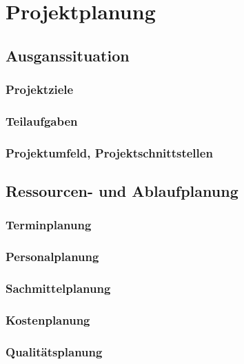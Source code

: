 \chapter{Projektplanung}
\label{cha:Projektmanagement}

\section{Ausganssituation}
	\subsection{Projektziele}
	
	\subsection{Teilaufgaben}
	
	\subsection{Projektumfeld, Projektschnittstellen}
	
\section{Ressourcen- und Ablaufplanung}
	\subsection{Terminplanung}
	
	\subsection{Personalplanung}
	
	\subsection{Sachmittelplanung}
	
	\subsection{Kostenplanung}
	
	\subsection{Qualitätsplanung}
	